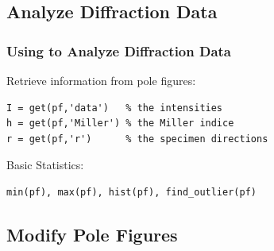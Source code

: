 \subsection*{Analyze Diffraction Data}

\begin{frame}[fragile]
  \frametitle{Using \MTEX to Analyze Diffraction Data}



Retrieve information from pole figures:
\begin{lstlisting}
I = get(pf,'data')   % the intensities
h = get(pf,'Miller') % the Miller indice
r = get(pf,'r')      % the specimen directions
\end{lstlisting}

Basic Statistics:
\begin{lstlisting}
min(pf), max(pf), hist(pf), find_outlier(pf)
\end{lstlisting}


\end{frame}

\subsection*{Modify Pole Figures}

